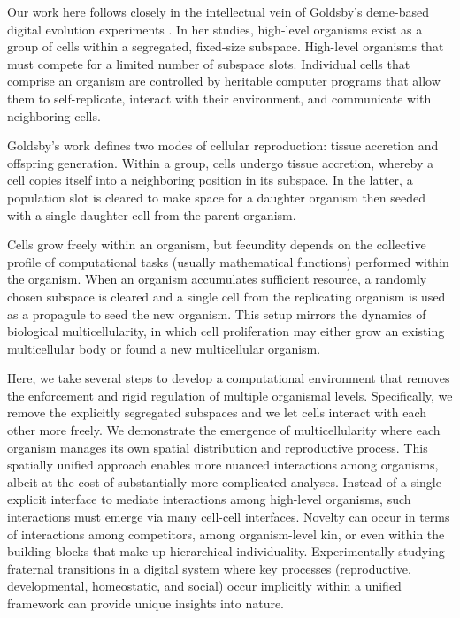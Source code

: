 Our work here follows closely in the intellectual vein of Goldsby's deme-based digital evolution experiments \citep{goldsby2012task, goldsby2014evolutionary}.
In her studies, high-level organisms exist as a group of cells within a segregated, fixed-size subspace.
High-level organisms that must compete for a limited number of subspace slots.
Individual cells that comprise an organism are controlled by heritable computer programs that allow them to self-replicate, interact with their environment, and communicate with neighboring cells.

Goldsby's work defines two modes of cellular reproduction: tissue accretion and offspring generation.
Within a group, cells undergo tissue accretion, whereby a cell copies itself into a neighboring position in its subspace.
In the latter, a population slot is cleared to make space for a daughter organism then seeded with a single daughter cell from the parent organism.

Cells grow freely within an organism, but fecundity depends on the collective profile of computational tasks (usually mathematical functions) performed within the organism.
When an organism accumulates sufficient resource, a randomly chosen subspace is cleared and a single cell from the replicating organism is used as a propagule to seed the new organism.
This setup mirrors the dynamics of biological multicellularity, in which cell proliferation may either grow an existing multicellular body or found a new multicellular organism.

Here, we take several steps to develop a computational environment that removes the enforcement and rigid regulation of multiple organismal levels.
Specifically, we remove the explicitly segregated subspaces and we let cells interact with each other more freely.
We demonstrate the emergence of multicellularity where each organism manages its own spatial distribution and reproductive process.
This spatially unified approach enables more nuanced interactions among organisms, albeit at the cost of substantially more complicated analyses.
Instead of a single explicit interface to mediate interactions among high-level organisms, such interactions must emerge via many cell-cell interfaces.
Novelty can occur in terms of interactions among competitors, among organism-level kin, or even within the building blocks that make up hierarchical individuality.
Experimentally studying fraternal transitions in a digital system where key processes (reproductive, developmental, homeostatic, and social) occur implicitly within a unified framework can provide unique insights into nature.

